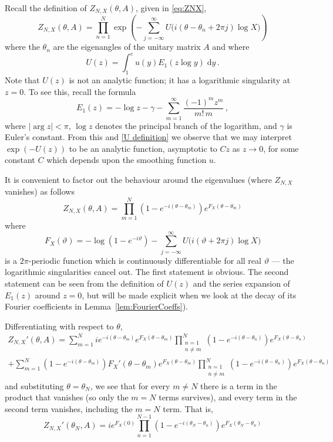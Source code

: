 \documentclass[12pt,a4paper,reqno]{amsart}
\theoremstyle{remark}
\numberwithin{equation}{section}
\newcommand{\ii}{i}
\newcommand{\dd}{\mathrm{d}}
\begin{document}
Recall the definition of $Z_{N,X}(\theta,A)$, given in \eqref{eq:ZNX},
\[
Z_{N,X}(\theta,A) = \prod_{n=1}^N\exp\left(-\sum_{j=-\infty}^\infty U\big(\ii(\theta-\theta_n + 2\pi j)\log X\big)\right)
\]
where the $\theta_n$ are the eigenangles of the unitary matrix $A$ and where
\[
U(z) = \int_1^e u(y) E_1(z\log y)\;\dd y \, .
\]
Note that $U(z)$ is not an analytic function; it has a logarithmic singularity at $z=0$. To see this, recall the formula
\begin{equation*}
E_1(z) = - \log z  -\gamma  - \sum_{m=1}^{\infty}
\frac{(-1)^{m}z^{m}}{m!\,m} \,,
\end{equation*}
where $|\arg z| < \pi$, $\log z$ denotes the principal
branch of the logarithm, and $\gamma$ is Euler's constant.  From this and \eqref{U definition} we observe that we may interpret
$\exp(-U(z))$ to be an analytic function, asymptotic to $C z$ as $z\to 0$, for some constant $C$ which depends upon the smoothing function $u$.

It is convenient to factor out the behaviour around the eigenvalues (where $Z_{N,X}$ vanishes) as follows
\[
Z_{N,X}(\theta, A) = \prod_{m=1}^N \left(1-e^{-\ii(\theta-\theta_m)} \right) e^{F_X(\theta-\theta_m)}
\]
where
\begin{equation}\label{eq:Ftheta}
F_X(\vartheta) =  - \log\left(1-e^{-\ii \vartheta} \right) -\sum_{j=-\infty}^\infty U\big(\ii(\vartheta + 2\pi j)\log X\big)
\end{equation}
is a $2\pi$-periodic function which is continuously differentiable for all real $\vartheta$ --- the logarithmic singularities cancel out. The first statement is obvious. The second statement can be seen from the definition of $U(z)$ and the series expansion of $E_1(z)$ around $z=0$, but will be made explicit when we look at the decay of its Fourier coefficients in Lemma~\ref{lem:FourierCoeffs}).




Differentiating with respect to $\theta$,
\begin{multline*}
Z_{N,X}'(\theta,A) = \sum_{m=1}^N \ii e^{-\ii(\theta-\theta_m)} e^{F_X(\theta-\theta_m)} \prod_{\substack{n=1\\n \neq m}}^N \left(1-e^{-\ii(\theta-\theta_n)} \right) e^{F_X(\theta-\theta_n)} \\
+ \sum_{m=1}^N \left(1-e^{-\ii(\theta-\theta_m)} \right) F_X'(\theta-\theta_m)  e^{F_X(\theta-\theta_m)} \prod_{\substack{n=1\\n \neq m}}^N \left(1-e^{-\ii(\theta-\theta_n)} \right) e^{F_X(\theta-\theta_n)}
\end{multline*}
and substituting $\theta=\theta_N$, we see that for every $m \neq N$ there is a term in the product that vanishes (so only the $m=N$ terms survives), and every term in the second term vanishes, including the $m=N$ term. That is,
\[
Z_{N,X}'(\theta_N,A) = \ii  e^{F_X(0)} \prod_{n=1}^{N-1} \left(1-e^{-\ii(\theta_N-\theta_n)} \right) e^{F_X(\theta_N-\theta_n)}
\]
\end{document}
